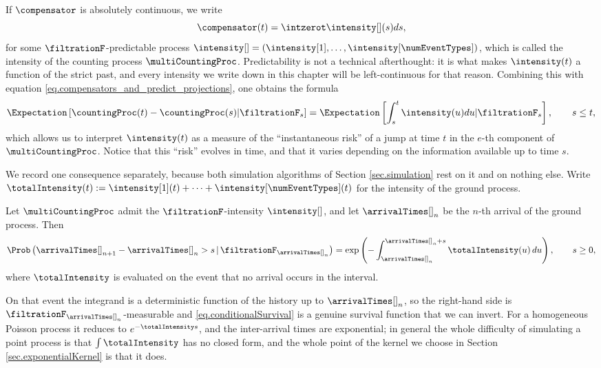 If $\compensator$ is absolutely continuous, we write
\begin{equation*}
 \compensator (t) = \intzerot \intensity[ ](s)ds,
\end{equation*}
for some $\filtrationF$-predictable process
$\intensity[ ] = (\intensity[1],\dots,\intensity[\numEventTypes])$,
which is called the intensity of the counting process $\multiCountingProc$.
Predictability is not a technical afterthought:
it is what makes $\intensity(t)$ a function of the strict past,
and every intensity we write down in this chapter will be left-continuous for that reason.
Combining this with equation \eqref{eq.compensators_and_predict_projections},
one obtains the formula
\begin{equation*}
 \Expectation\left[ \countingProc(t)-\countingProc(s) \vert \filtrationF_s \right]
 =
 \Expectation\left[ \int_{s}^{t} \intensity(u) du
  \vert \filtrationF_s \right],
  \qquad  s\leq t,
\end{equation*}
which allows us to interpret $\intensity(t)$ as a measure of the ``instantaneous risk'' of a
jump at time $t$ in the $e$-th component of $\multiCountingProc$.
Notice that this ``risk'' evolves in time,
and that it varies depending on the information available up to time $s$.

We record one consequence separately, because both simulation algorithms of
Section \ref{sec.simulation} rest on it and on nothing else.
Write $\totalIntensity(t) := \intensity[1](t) + \dots + \intensity[\numEventTypes](t)$
for the intensity of the ground process.

\begin{prop}\label{prop.conditionalSurvival}
 Let $\multiCountingProc$ admit the $\filtrationF$-intensity $\intensity[ ]$,
 and let $\arrivalTimes[ ]_{n}$ be the $n$-th arrival of the ground process.
 Then
 \begin{equation}\label{eq.conditionalSurvival}
  \Prob \left( \arrivalTimes[ ]_{n+1} - \arrivalTimes[ ]_{n} > s
  \, \vert \, \filtrationF_{\arrivalTimes[ ]_{n}} \right)
  =
  \exp \left( - \int_{\arrivalTimes[ ]_{n}}^{\arrivalTimes[ ]_{n}+s}
  \totalIntensity(u) \, du \right),
  \qquad s \geq 0,
 \end{equation}
 where $\totalIntensity$ is evaluated on the event that no arrival occurs in the interval.
\end{prop}

On that event the integrand is a deterministic function of the history up to
$\arrivalTimes[ ]_{n}$,
so the right-hand side is $\filtrationF_{\arrivalTimes[ ]_{n}}$-measurable
and \eqref{eq.conditionalSurvival} is a genuine survival function that we can invert.
For a homogeneous Poisson process it reduces to $e^{-\totalIntensity s}$,
and the inter-arrival times are exponential;
in general the whole difficulty of simulating a point process is that
$\int \totalIntensity$ has no closed form,
and the whole point of the kernel we choose in Section \ref{sec.exponentialKernel} is that it does.

